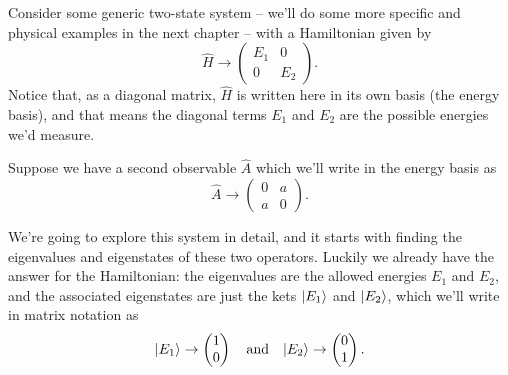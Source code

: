 \begin{example}

Consider some generic two-state system -- we'll do some more specific and physical examples in the next chapter -- with a Hamiltonian given by
\[
\hat{H} \to \begin{pmatrix}
E_1 & 0 \\ 0 & E_2
\end{pmatrix}.
\]
Notice that, as a diagonal matrix, $\hat{H}$ is written here in its own basis (the energy basis), and that means the diagonal terms $E_1$ and $E_2$ are the possible energies we'd measure.

Suppose we have a second observable $\hat{A}$ which we'll write in the energy basis as
\[
\hat{A} \to \begin{pmatrix}
0 & a \\ a & 0
\end{pmatrix}.
\]

We're going to explore this system in detail, and it starts with finding the eigenvalues and eigenstates of these two operators.  Luckily we already have the answer for the Hamiltonian:  the eigenvalues are the allowed energies $E_1$ and $E_2$, and the associated eigenstates are just the kets $| E_1 \rangle$ and $| E_2 \rangle$, which we'll write in matrix notation as
\[
| E_1 \rangle \to \begin{pmatrix} 1 \\ 0 \end{pmatrix} \quad \text{and} \quad | E_2 \rangle \to \begin{pmatrix} 0 \\ 1 \end{pmatrix}.
\]


\end{example}
